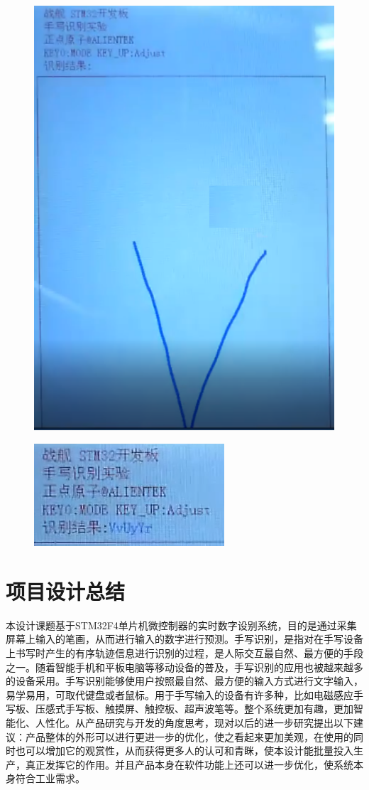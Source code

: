 \documentclass[UTF8]{ctexart}
\begin{document}
\begin{figure}[H]
	\centering
	\includegraphics[scale = 0.3]{16}
\end{figure}
\begin{figure}[H]
	\centering
	\includegraphics[scale = 0.3]{17}
\end{figure}

\section{项目设计总结}
本设计课题基于STM32F4单片机微控制器的实时数字设别系统，目的是通过采集屏幕上输入的笔画，从而进行输入的数字进行预测。手写识别，是指对在手写设备上书写时产生的有序轨迹信息进行识别的过程，是人际交互最自然、最方便的手段之一。随着智能手机和平板电脑等移动设备的普及，手写识别的应用也被越来越多的设备采用。手写识别能够使用户按照最自然、最方便的输入方式进行文字输入，易学易用，可取代键盘或者鼠标。用于手写输入的设备有许多种，比如电磁感应手写板、压感式手写板、触摸屏、触控板、超声波笔等。整个系统更加有趣，更加智能化、人性化。从产品研究与开发的角度思考，现对以后的进一步研究提出以下建议：产品整体的外形可以进行更进一步的优化，使之看起来更加美观，在使用的同时也可以增加它的观赏性，从而获得更多人的认可和青眯，使本设计能批量投入生产，真正发挥它的作用。并且产品本身在软件功能上还可以进一步优化，使系统本身符合工业需求。
\end{document}
